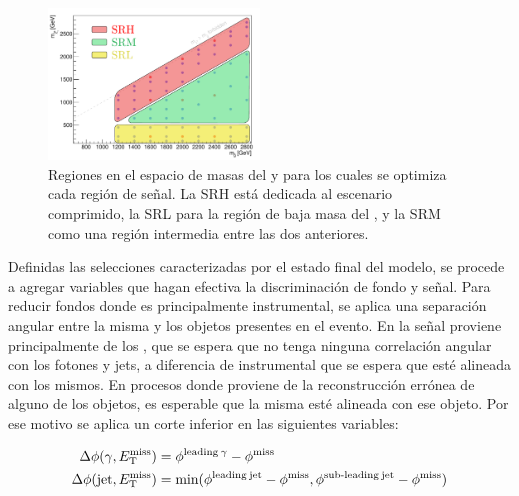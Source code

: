 \begin{figure}[ht!]
  \centering
  \includegraphics[width=0.5\textwidth]{images/analysis/sr_design.pdf}
  \caption{Regiones en el espacio de masas del \gluino y \ninoone para los cuales se optimiza cada región de señal. La SRH está dedicada al escenario comprimido, la SRL para la región de baja masa del \ninoone, y la SRM como una región intermedia entre las dos anteriores.}
  \label{fig:sr_design}
\end{figure}


Definidas las selecciones caracterizadas por el estado final del modelo, se procede a agregar variables que hagan efectiva la discriminación de fondo y señal. Para reducir fondos donde \met es principalmente instrumental, se aplica una separación angular entre la misma y los objetos presentes en el evento. En la señal \met proviene principalmente de los \gravino, que se espera que no tenga ninguna correlación angular con los fotones y jets, a diferencia de \met instrumental que se espera que esté alineada con los mismos. En procesos donde \met proviene de la reconstrucción errónea de alguno de los objetos, es esperable que la misma esté alineada con ese objeto. Por ese motivo se aplica un corte inferior en las siguientes variables:

\begin{equation}
  \begin{split}
  \Delta\phi(\gamma, E_{\text{T}}^{\text{miss}}) & = \phi^{\text{leading}\: \gamma} - \phi^{\text{miss}} \\
  \Delta\phi(\text{jet}, E_{\text{T}}^{\text{miss}}) & = \text{min}(\phi^{\text{leading}\: \text{jet}} - \phi^{\text{miss}}, \phi^{\text{sub-leading}\: \text{jet}} - \phi^{\text{miss}}) \\
  \end{split}
\end{equation}

